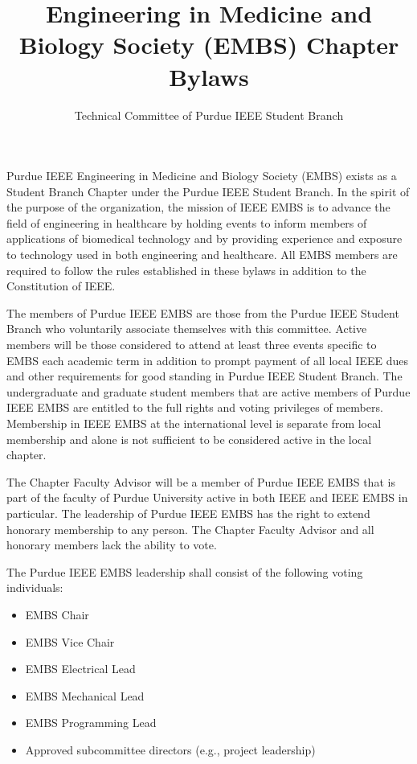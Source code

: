 \documentclass[12pt]{constitution}
\title{Engineering in Medicine and Biology Society (EMBS) Chapter Bylaws}
\author{Technical Committee of Purdue IEEE Student Branch}
\date{}
\begin{document}

\titlecontentspage
\newpage


\label{art:namepurp}

Purdue IEEE Engineering in Medicine and Biology Society (EMBS) exists as a Student Branch Chapter under the Purdue IEEE Student Branch. In the spirit of the purpose of the organization, the mission of IEEE EMBS is to advance the field of engineering in healthcare by holding events to inform members of applications of biomedical technology and by providing experience and exposure to technology used in both engineering and healthcare. All EMBS members are required to follow the rules established in these bylaws in addition to the Constitution of IEEE.

\label{art:member}

The members of Purdue IEEE EMBS are those from the Purdue IEEE Student Branch who voluntarily associate themselves with this committee. Active members will be those considered to attend at least three events specific to EMBS each academic term in addition to prompt payment of all local IEEE dues and other requirements for good standing in Purdue IEEE Student Branch. The undergraduate and graduate student members that are active members of Purdue IEEE EMBS are entitled to the full rights and voting privileges of members. Membership in IEEE EMBS at the international level is separate from local membership and alone is not sufficient to be considered active in the local chapter.

The Chapter Faculty Advisor will be a member of Purdue IEEE EMBS that is part of the faculty of Purdue University active in both IEEE and IEEE EMBS in particular. The leadership of Purdue IEEE EMBS has the right to extend honorary membership to any person. The Chapter Faculty Advisor and all honorary members lack the ability to vote.

\label{art:leader}

The Purdue IEEE EMBS leadership shall consist of the following voting individuals:
\begin{itemize}
    \item EMBS Chair
    \item EMBS Vice Chair
    \item EMBS Electrical Lead
    \item EMBS Mechanical Lead
    \item EMBS Programming Lead
    \item Approved subcommittee directors (e.g., project leadership)
\end{itemize}
\end{document}
